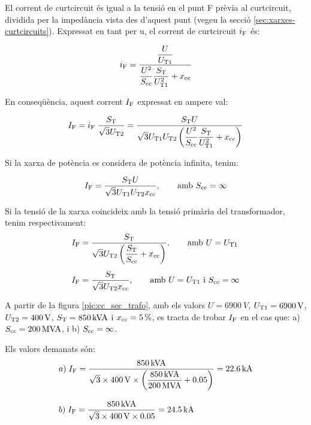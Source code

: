 El corrent de curtcircuit és igual a la tensió en el punt F prèvia al curtcircuit, dividida per la impedància vista des d'aquest punt (vegeu la secció \ref{sec:xarxes-curtcircuits}). Expressat en tant per u, el corrent de curtcircuit $i_\mathrm{F}$ és:

\begin{equation}
    i_\mathrm{F} = \frac{\dfrac{U}{U_\mathrm{T1}}}{\dfrac{U^2}{S_\mathrm{cc}}
    \dfrac{S_\mathrm{T}}{U_\mathrm{T1}^2} + x_\mathrm{cc}}
\end{equation}

En conseqüència, aquest corrent $I_\mathrm{F}$ expressat en ampere val:

\begin{equation}
    I_\mathrm{F} = i_\mathrm{F}\; \frac{S_\mathrm{T}}{\sqrt{3}U_\mathrm{T2}} =
    \frac{S_\mathrm{T} U}{\sqrt{3} U_\mathrm{T1}U_\mathrm{T2}
    \left(\dfrac{U^2}{S_\mathrm{cc}}
    \dfrac{S_\mathrm{T}}{U_\mathrm{T1}^2} + x_\mathrm{cc}\right)}
\end{equation}

Si la xarxa de potència es considera de potència infinita, tenim:

\begin{equation}
    I_\mathrm{F} = \frac{S_\mathrm{T} U}{\sqrt{3} U_\mathrm{T1}U_\mathrm{T2}
    x_\mathrm{cc}},\qquad \text{amb }S_\mathrm{cc}=\infty
\end{equation}

Si  la tensió de la xarxa coincideix amb la tensió primària
del transformador, tenim respectivament:
\begin{align}
    I_\mathrm{F} &= \frac{S_\mathrm{T}}{\sqrt{3} U_\mathrm{T2}
    \left(\dfrac{S_\mathrm{T}}{S_\mathrm{cc}} +
    x_\mathrm{cc}\right)},\qquad \text{amb }U=U_\mathrm{T1}\\[1ex]
    I_\mathrm{F} &= \frac{S_\mathrm{T}}{\sqrt{3} U_\mathrm{T2}
    x_\mathrm{cc}}, \qquad \text{amb }U=U_\mathrm{T1}\text{ i }
    S_\mathrm{cc}=\infty
\end{align}


\begin{exemple}[\CorrentCcSecTrafo{}]
	\addcontentsxms{\CorrentCcSecTrafo}
    A partir de la figura \vref{pic:cc_sec_trafo}, amb els valors
    $U=\qty{6900}{V}$, $U_\mathrm{T1}=\qty{6900}{V}$,
    $U_\mathrm{T2}=\qty{400}{V}$, $S_\mathrm{T}=\qty{850}{kVA}$ i
    $x_\mathrm{cc}=\qty{5}{\percent}$, es tracta de trobar $I_\mathrm{F}$ en el cas
    que: a) $S_\mathrm{cc}=\qty{200}{MVA}$, i b) $S_\mathrm{cc}=\infty$.

    Els valors demanats són:
    \begin{align*}
       &a)\;I_\mathrm{F} = \frac{\qty{850}{kVA}}{\sqrt{3}\times \qty{400}{V}\times
       \left(\dfrac{\qty{850}{kVA}}{\qty{200}{MVA}} +
       \num{0,05}\right)} = \qty{22,6}{kA} \\[2ex]
       &b)\;I_\mathrm{F} = \frac{\qty{850}{kVA}}{\sqrt{3}\times \qty{400}{V}\times
       \num{0,05}} = \qty{24,5}{kA}
    \end{align*}

\end{exemple}



